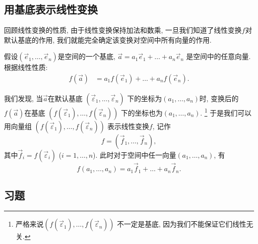 \subsection{用基底表示线性变换}

回顾线性变换的性质, 由于线性变换保持加法和数乘,
一旦我们知道了线性变换$f$对默认基底的作用,
我们就能完全确定该变换对空间中所有向量的作用.

假设$(\vec e_1,\dots,\vec e_n)$是空间的一个基底,
$\vec a = a_1\vec e_1 + \dots + a_n\vec e_n$
是空间中的任意向量. 根据线性性质:
\begin{align*}
  f(\vec a) & = a_1f(\vec e_1) + \dots + a_nf(\vec e_n).
\end{align*}

我们发现, 当$\vec a$在默认基底
$(\vec\varepsilon_1,\dots,\vec\varepsilon_n)$
下的坐标为$(a_1,\dots,a_n)$时,
变换后的$f(\vec a)$在基底
$(f(\vec\varepsilon_1),\dots,f(\vec\varepsilon_n))$
下的坐标也为$(a_1,\dots,a_n)$.
\footnote{
  严格来说$(f(\vec\varepsilon_1),\dots,f(\vec\varepsilon_n))$
  不一定是基底, 因为我们不能保证它们线性无关.
}
于是我们可以用向量组
$(f(\vec\varepsilon_1),\dots,f(\vec\varepsilon_n))$
表示线性变换$f$, 记作
\[
  f = (\vec f_1,\dots,\vec f_n),
\]
其中$\vec f_i = f(\vec\varepsilon_i)$ ($i=1,\dots,n$).
此时对于空间中任一向量$(a_1,\dots,a_n)$, 有
\[
  f(a_1,\dots,a_n) = a_1 \vec f_1 + \dots + a_n \vec f_n.
\]

\subsection*{习题}

